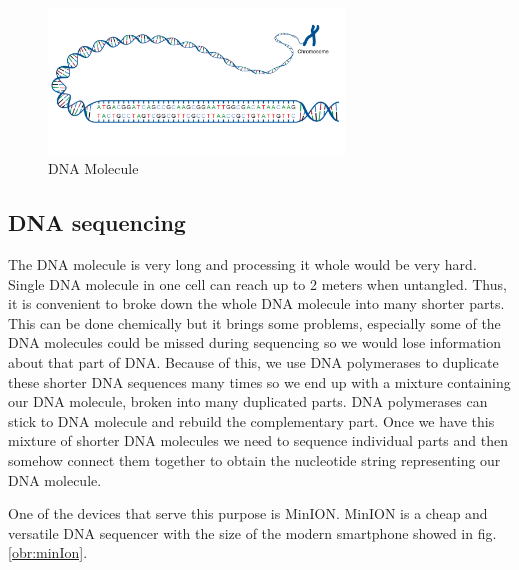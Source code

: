 
\begin{figure}
\centerline{\includegraphics[width=0.7\textwidth, height=0.3\textheight]{images/acgt}}
\caption[DNA]{DNA Molecule}
\label{obr:acgt}
\end{figure}

\subsection{DNA sequencing}

The DNA molecule is very long and processing it whole would be very hard. Single
DNA molecule in one cell can reach up to 2 meters when untangled.
Thus, it is convenient to broke down the whole DNA molecule into many shorter parts.
This can be done chemically but it brings some problems, especially some of the
DNA molecules could be missed during sequencing so we would lose information about
that part of DNA. Because of this, we use DNA polymerases to duplicate these shorter DNA sequences
many times so we end up with a mixture containing our DNA molecule, broken into
many duplicated parts. DNA polymerases can stick to DNA molecule and rebuild the complementary
part. Once we have this mixture of shorter DNA molecules we need to sequence individual
parts and then somehow connect them together to obtain the nucleotide string representing
our DNA molecule.

One of the devices that serve this purpose is MinION\cite{lu2016oxford}. MinION is
a cheap and versatile DNA sequencer with the size of the modern smartphone showed in fig.
\ref{obr:minIon}.

